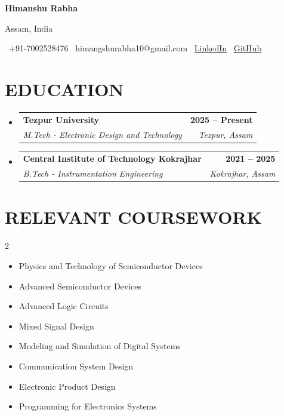 \documentclass[letterpaper,11pt]{article}
\makeatletter
\newcommand{\resumeSubheading}[4]{
\vspace{-2pt}\item
\begin{tabular*}{1.0\textwidth}[t]{l@{\extracolsep{\fill}}r}
\textbf{\large #1} & \textbf{\small #2} \\
\textit{\small #3} & \textit{\small #4} \\
\end{tabular*}\vspace{-7pt}
}
\newcommand{\resumeSubHeadingListStart}{\begin{itemize}[leftmargin=0.0in,label={}]}
\newcommand{\resumeSubHeadingListEnd}{\end{itemize}}
\makeatother
\begin{document}

\begin{center}

{\Huge \textbf{Himanshu Rabha}}

\vspace{3pt}

Assam, India

\vspace{3pt}

\small
\faPhone\ +91-7002528476
\quad
\faEnvelope\ himangshurabha10@gmail.com
\quad
\faLinkedin\ \href{https://linkedin.com/in/himanshurabha}{LinkedIn} \quad
\quad
\faGithub\ \href{https://github.com/himanshu-rabha}{GitHub}

\end{center}

\vspace{-5pt}


\section{EDUCATION}

\resumeSubHeadingListStart

\resumeSubheading
{Tezpur University}{2025 -- Present}
{M.Tech - Electronic Design and Technology}{Tezpur, Assam}

\resumeSubheading
{Central Institute of Technology Kokrajhar}{2021 -- 2025}
{B.Tech - Instrumentation Engineering}{Kokrajhar, Assam}

\resumeSubHeadingListEnd


\section{RELEVANT COURSEWORK}

\begin{multicols}{2}
\begin{itemize}[itemsep=-2pt]

\item Physics and Technology of Semiconductor Devices
\item Advanced Semiconductor Devices
\item Advanced Logic Circuits
\item Mixed Signal Design
\item Modeling and Simulation of Digital Systems
\item Communication System Design
\item Electronic Product Design
\item Programming for Electronics Systems

\end{itemize}
\end{multicols}
\end{document}

